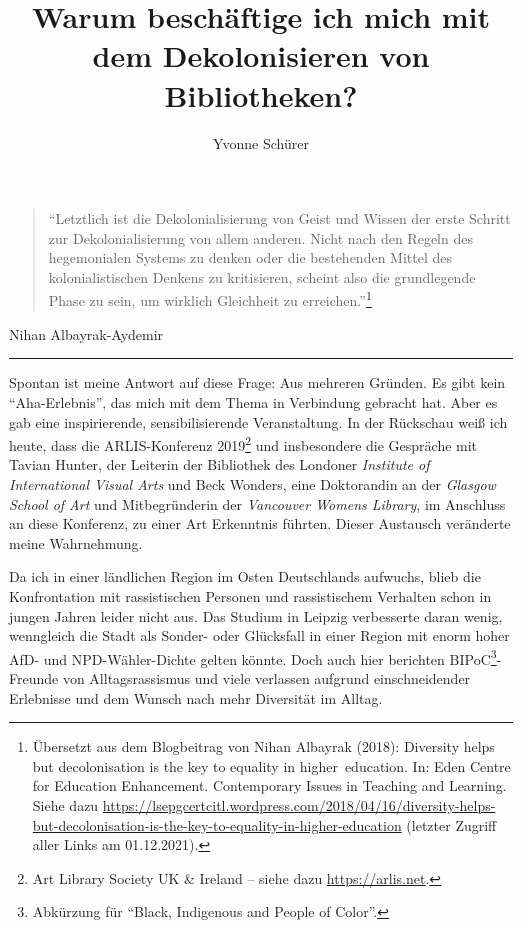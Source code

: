 \documentclass[a4paper,
fontsize=11pt,
oneside,
numbers=noperiodatend,
parskip=half-,
bibliography=totoc,
final
]{scrartcl}
\title{\LARGE{Warum beschäftige ich mich mit dem Dekolonisieren von Bibliotheken?}}%
\author{Yvonne Schürer} %
\date{}
\begin{document}
\maketitle
\thispagestyle{fancyplain} 


\begin{quote}
\enquote{Letztlich ist die Dekolonialisierung von Geist und Wissen der erste
Schritt zur Dekolonialisierung von allem anderen. Nicht nach den Regeln
des hegemonialen Systems zu denken oder die bestehenden Mittel des
kolonialistischen Denkens zu kritisieren, scheint also die grundlegende
Phase zu sein, um wirklich Gleichheit zu erreichen.}\footnote{Übersetzt
  aus dem Blogbeitrag von Nihan Albayrak (2018): Diversity helps but
  decolonisation is the key to equality in higher~education. In: Eden
  Centre for Education Enhancement. Contemporary Issues in Teaching and
  Learning. Siehe dazu
  \url{https://lsepgcertcitl.wordpress.com/2018/04/16/diversity-helps-but-decolonisation-is-the-key-to-equality-in-higher-education}
  (letzter Zugriff aller Links am 01.12.2021).}
\end{quote}
\begin{flushright}Nihan Albayrak-Aydemir\end{flushright}

\begin{center}\rule{0.5\linewidth}{0.5pt}\end{center}

Spontan ist meine Antwort auf diese Frage: Aus mehreren Gründen. Es gibt
kein \enquote{Aha-Erlebnis}, das mich mit dem Thema in Verbindung
gebracht hat. Aber es gab eine inspirierende, sensibilisierende
Veranstaltung. In der Rückschau weiß ich heute, dass die ARLIS-Konferenz
2019\footnote{Art Library Society UK \& Ireland -- siehe dazu
  \url{https://arlis.net}.} und insbesondere die Gespräche mit Tavian
Hunter, der Leiterin der Bibliothek des Londoner \emph{Institute of
International Visual Arts} und Beck Wonders, eine Doktorandin an der
\emph{Glasgow School of Art} und Mitbegründerin der \emph{Vancouver
Womens Library}, im Anschluss an diese Konferenz, zu einer Art
Erkenntnis führten. Dieser Austausch veränderte meine Wahrnehmung.

Da ich in einer ländlichen Region im Osten Deutschlands aufwuchs, blieb
die Konfrontation mit rassistischen Personen und rassistischem Verhalten
schon in jungen Jahren leider nicht aus. Das Studium in Leipzig
verbesserte daran wenig, wenngleich die Stadt als Sonder- oder
Glücksfall in einer Region mit enorm hoher AfD- und NPD-Wähler-Dichte
gelten könnte. Doch auch hier berichten BIPoC\footnote{Abkürzung für
  \enquote{Black, Indigenous and People of Color}.}-Freunde von
Alltagsrassismus und viele verlassen aufgrund einschneidender Erlebnisse
und dem Wunsch nach mehr Diversität im Alltag.
\end{document}
